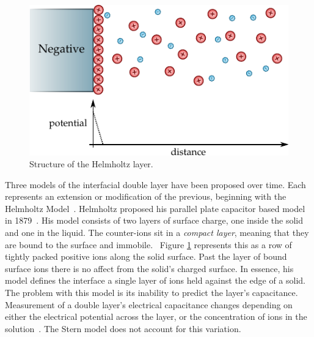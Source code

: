       \begin{figure}
        \begin{center}
          \includegraphics{content/introduction/graphics/model_helmholtz}
        \end{center}
        \caption{Structure of the Helmholtz layer.}
        \label{fig:doubleLayerModel_helmholtz}
      \end{figure}
      Three models of the interfacial double layer have been proposed over time.
      Each represents an extension or modification of the previous, beginning with the Helmholtz Model~\cite{Horch2004}.
      Helmholtz proposed his parallel plate capacitor based model in 1879~\cite{Geddes1997}.
      His model consists of two layers of surface charge, one inside the solid and one in the liquid.
      The counter-ions sit in a \emph{compact layer}, meaning that they are bound to the surface and immobile.~\cite{Salieb-Beugelaar2009}
      Figure \ref{fig:doubleLayerModel_helmholtz} represents this as a row of tightly packed positive ions along the solid surface.
      Past the layer of bound surface ions there is no affect from the solid's charged surface.
      In essence, his model defines the interface a single layer of ions held against the edge of a solid.
      The problem with this model is its inability to predict the layer's capacitance.
      Measurement of a double layer's electrical capacitance changes depending on either the electrical potential across the layer, or the concentration of ions in the solution~\cite{Bard1980}.
      The Stern model does not account for this variation.
      
